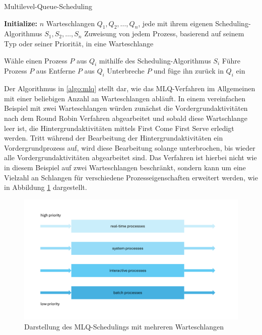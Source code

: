 \begin{algorithm}
	\caption{Multilevel-Queue-Scheduling} \label{algo:mlq}
	\begin{algorithmic}[1]

		\State \textbf{Initialize:} $n$ Warteschlangen $Q_1, Q_2, \ldots, Q_n$, jede mit ihrem eigenen Scheduling-Algorithmus $S_1, S_2, \ldots, S_n$
		\State Zuweisung von jedem Prozess, basierend auf seinem Typ oder seiner Priorität, in eine Warteschlange

		\State Wähle einen Prozess $P$ aus $Q_i$ mithilfe des Scheduling-Algorithmus $S_i$
		\State Führe Prozess $P$ aus
		\State Entferne $P$ aus $Q_i$
		\State Unterbreche $P$ und füge ihn zurück in $Q_i$ ein
		\EndIf
		\EndIf
		\EndFor
		\EndWhile

	\end{algorithmic}
\end{algorithm}

Der Algorithmus in \ref{algo:mlq} stellt dar, wie das \ac{MLQ}-Verfahren im Allgemeinen mit einer beliebigen Anzahl an Warteschlangen abläuft.
In einem vereinfachen Beispiel mit zwei Warteschlangen würden zunächst die Vordergrundaktivitäten nach dem Round Robin Verfahren abgearbeitet und sobald diese Wartschlange leer ist, die Hintergrundaktivitäten mittels First Come First Serve erledigt werden. Tritt während der Bearbeitung der Hintergrundaktivitäten ein Vordergrundprozess auf, wird diese Bearbeitung solange unterbrochen, bis wieder alle Vordergrundaktivitäten abgearbeitet sind.
Das Verfahren ist hierbei nicht wie in diesem Beispiel auf zwei Warteschlangen beschränkt, sondern kann um eine Vielzahl an Schlangen für verschiedene Prozesseigenschaften erweitert werden, wie in Abbildung \ref{fig:mlq_queues} dargestellt.
\begin{figure}[ht]
	\centering
	\includegraphics[width=\linewidth]{img/mlq.pdf}
	\caption{Darstellung des \ac{MLQ}-Schedulings mit mehreren Warteschlangen \cite[S.215]{Silberschatz.2019}}
	\label{fig:mlq_queues}
\end{figure}

